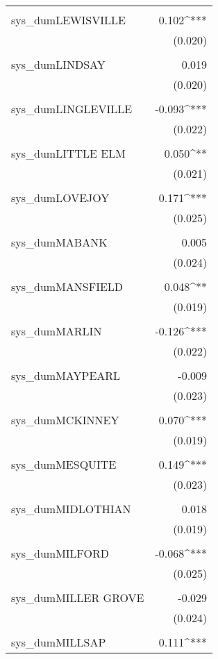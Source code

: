 \begin{table}[!htbp]
\begin{tabular}{@{\extracolsep{5pt}}lD{.}{.}{-3} }
  & \\ 
 sys\_dumLEWISVILLE & 0.102^{***} \\ 
  & (0.020) \\ 
  & \\ 
 sys\_dumLINDSAY & 0.019 \\ 
  & (0.020) \\ 
  & \\ 
 sys\_dumLINGLEVILLE & -0.093^{***} \\ 
  & (0.022) \\ 
  & \\ 
 sys\_dumLITTLE ELM & 0.050^{**} \\ 
  & (0.021) \\ 
  & \\ 
 sys\_dumLOVEJOY & 0.171^{***} \\ 
  & (0.025) \\ 
  & \\ 
 sys\_dumMABANK & 0.005 \\ 
  & (0.024) \\ 
  & \\ 
 sys\_dumMANSFIELD & 0.048^{**} \\ 
  & (0.019) \\ 
  & \\ 
 sys\_dumMARLIN & -0.126^{***} \\ 
  & (0.022) \\ 
  & \\ 
 sys\_dumMAYPEARL & -0.009 \\ 
  & (0.023) \\ 
  & \\ 
 sys\_dumMCKINNEY & 0.070^{***} \\ 
  & (0.019) \\ 
  & \\ 
 sys\_dumMESQUITE & 0.149^{***} \\ 
  & (0.023) \\ 
  & \\ 
 sys\_dumMIDLOTHIAN & 0.018 \\ 
  & (0.019) \\ 
  & \\ 
 sys\_dumMILFORD & -0.068^{***} \\ 
  & (0.025) \\ 
  & \\ 
 sys\_dumMILLER GROVE & -0.029 \\ 
  & (0.024) \\ 
  & \\ 
 sys\_dumMILLSAP & 0.111^{***} \\ 

\end{tabular}
\end{table}
